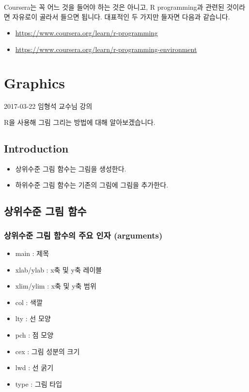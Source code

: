 \documentclass[12pt,]{krantz}
\providecommand{\tightlist}{%
  \setlength{\itemsep}{0pt}\setlength{\parskip}{0pt}}
\renewenvironment{quote}{\begin{VF}}{\end{VF}}
\begin{document}
Coursera는 꼭 어느 것을 들어야 하는 것은 아니고, R programming과 관련된
것이라면 자유로이 골라서 들으면 됩니다. 대표적인 두 가지만 들자면 다음과
같습니다.

\begin{itemize}
\tightlist
\item
  \url{https://www.coursera.org/learn/r-programming}
\item
  \url{https://www.coursera.org/learn/r-programming-environment}
\end{itemize}

\mainmatter

\chapter{Graphics}\label{graphics}

\begin{quote}
2017-03-22 임형석 교수님 강의
\end{quote}

R을 사용해 그림 그리는 방법에 대해 알아보겠습니다.

\section{Introduction}\label{introduction}

\begin{itemize}
\tightlist
\item
  상위수준 그림 함수는 그림을 생성한다.
\item
  하위수준 그림 함수는 기존의 그림에 그림을 추가한다.
\end{itemize}

\section{상위수준 그림 함수}\label{upper}

\subsection{상위수준 그림 함수의 주요 인자
(arguments)}\label{-----arguments}

\begin{itemize}
\tightlist
\item
  main : 제목
\item
  xlab/ylab : x축 및 y축 레이블
\item
  xlim/ylim : x축 및 y축 범위
\item
  col : 색깔
\item
  lty : 선 모양
\item
  pch : 점 모양
\item
  cex : 그림 성분의 크기
\item
  lwd : 선 굵기
\item
  type : 그림 타입
\end{itemize}
\end{document}
